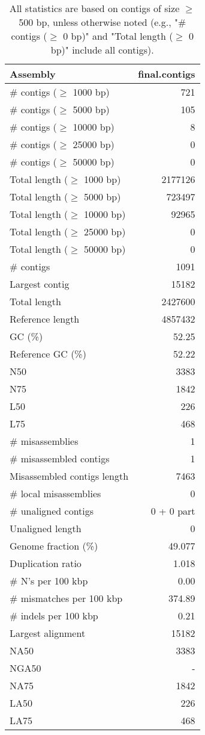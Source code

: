 \documentclass[12pt,a4paper]{article}
\begin{document}
\begin{table}[ht]
\begin{center}
\caption{All statistics are based on contigs of size $\geq$ 500 bp, unless otherwise noted (e.g., "\# contigs ($\geq$ 0 bp)" and "Total length ($\geq$ 0 bp)" include all contigs).}
\begin{tabular}{|l*{1}{|r}|}
\hline
Assembly & final.contigs \\ \hline
\# contigs ($\geq$ 1000 bp) & 721 \\ \hline
\# contigs ($\geq$ 5000 bp) & 105 \\ \hline
\# contigs ($\geq$ 10000 bp) & 8 \\ \hline
\# contigs ($\geq$ 25000 bp) & 0 \\ \hline
\# contigs ($\geq$ 50000 bp) & 0 \\ \hline
Total length ($\geq$ 1000 bp) & 2177126 \\ \hline
Total length ($\geq$ 5000 bp) & 723497 \\ \hline
Total length ($\geq$ 10000 bp) & 92965 \\ \hline
Total length ($\geq$ 25000 bp) & 0 \\ \hline
Total length ($\geq$ 50000 bp) & 0 \\ \hline
\# contigs & 1091 \\ \hline
Largest contig & 15182 \\ \hline
Total length & 2427600 \\ \hline
Reference length & 4857432 \\ \hline
GC (\%) & 52.25 \\ \hline
Reference GC (\%) & 52.22 \\ \hline
N50 & 3383 \\ \hline
N75 & 1842 \\ \hline
L50 & 226 \\ \hline
L75 & 468 \\ \hline
\# misassemblies & 1 \\ \hline
\# misassembled contigs & 1 \\ \hline
Misassembled contigs length & 7463 \\ \hline
\# local misassemblies & 0 \\ \hline
\# unaligned contigs & 0 + 0 part \\ \hline
Unaligned length & 0 \\ \hline
Genome fraction (\%) & 49.077 \\ \hline
Duplication ratio & 1.018 \\ \hline
\# N's per 100 kbp & 0.00 \\ \hline
\# mismatches per 100 kbp & 374.89 \\ \hline
\# indels per 100 kbp & 0.21 \\ \hline
Largest alignment & 15182 \\ \hline
NA50 & 3383 \\ \hline
NGA50 & - \\ \hline
NA75 & 1842 \\ \hline
LA50 & 226 \\ \hline
LA75 & 468 \\ \hline
\end{tabular}
\end{center}
\end{table}
\end{document}
